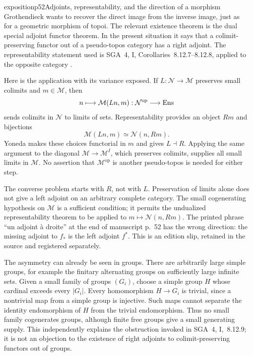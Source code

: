 \begin{dcomment}{exposition}{p52}{Adjoints, representability, and the direction of a morphism}
Grothendieck wants to recover the direct image from the inverse image, just as for a geometric morphism of topoi. The relevant existence theorem is the dual special adjoint functor theorem. In the present situation it says that a colimit-preserving functor out of a pseudo-topos category has a right adjoint. The representability statement used is SGA~4, I, Corollaries~8.12.7--8.12.8, applied to the opposite category \citep{SGA4I1972}.

Here is the application with its variance exposed. If $L:\mathcal N\to\mathcal M$ preserves small colimits and $m\in\mathcal M$, then
\[
 n\longmapsto\mathcal M(Ln,m):\mathcal N^{\mathrm{op}}\longrightarrow\mathrm{Ens}
\]
sends colimits in $\mathcal N$ to limits of sets. Representability provides an object $Rm$ and bijections
\[
 \mathcal M(Ln,m)\simeq\mathcal N(n,Rm).
\]
Yoneda makes these choices functorial in $m$ and gives $L\dashv R$. Applying the same argument to the diagonal $\mathcal M\to\mathcal M^I$, which preserves colimits, supplies all small limits in $\mathcal M$. No assertion that $\mathcal M^{\mathrm{op}}$ is another pseudo-topos is needed for either step.

The converse problem starts with $R$, not with $L$. Preservation of limits alone does not give a left adjoint on an arbitrary complete category. The small cogenerating hypothesis on $\mathcal M$ is a sufficient condition; it permits the undualized representability theorem to be applied to $m\mapsto\mathcal N(n,Rm)$. The printed phrase ``un adjoint \`a droite'' at the end of manuscript p.~52 has the wrong direction: the missing adjoint to $f_*$ is the left adjoint $f^*$. This is an edition slip, retained in the source and registered separately.

The asymmetry can already be seen in groups. There are arbitrarily large simple groups, for example the finitary alternating groups on sufficiently large infinite sets. Given a small family of groups $(G_i)$, choose a simple group $H$ whose cardinal exceeds every $|G_i|$. Every homomorphism $H\to G_i$ is trivial, since a nontrivial map from a simple group is injective. Such maps cannot separate the identity endomorphism of $H$ from the trivial endomorphism. Thus no small family cogenerates groups, although finite free groups give a small generating supply. This independently explains the obstruction invoked in SGA~4, I,~8.12.9; it is not an objection to the existence of right adjoints to colimit-preserving functors out of groups.


\end{dcomment}
